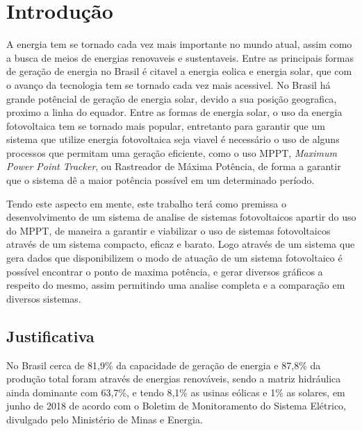 \chapter{Introdução}
\label{cap:01}
A energia tem se tornado cada vez mais importante no mundo atual, assim como a busca de meios de energias renovaveis e sustentaveis. Entre as principais formas de geração de energia no Brasil é citavel a energia eolica e energia solar, que com o avanço da tecnologia tem se tornado cada vez mais acessivel. No Brasil há grande potêncial de geração de energia solar, devido a sua posição geografica, proximo a linha do equador. Entre as formas de energia solar, o uso da energia fotovoltaica tem se tornado mais popular, entretanto para garantir que um sistema que utilize energia fotovoltaica seja viavel é necessário o uso de alguns processos que permitam uma geração eficiente, como o uso MPPT, \textit{Maximum Power Point Tracker}, ou Rastreador de Máxima Potência, de forma a garantir que o sistema dê a maior potência possível em um determinado período.

\indent		Tendo este aspecto em mente, este trabalho terá como premissa o desenvolvimento de um sistema de analise de sistemas fotovoltaicos apartir do uso do MPPT, de maneira a garantir e viabilizar o uso de sistemas fotovoltaicos através de um sistema compacto, eficaz e barato.
Logo através de um sistema que gera dados que disponibilizem o modo de atuação de um sistema fotovoltaico é possível encontrar o ponto de maxima potência, e gerar diversos gráficos a respeito do mesmo, assim permitindo uma analise completa e a comparação em diversos sistemas.


\section{Justificativa}

No Brasil cerca de 81,9\% da capacidade de geração de energia e 87,8\% da produção total foram através de energias renováveis, sendo a matriz hidráulica ainda dominante com 63,7\%, e tendo 8,1\% as usinas eólicas e 1\% as solares, em junho de 2018 de acordo com o Boletim de Monitoramento do Sistema Elétrico, divulgado pelo Ministério de Minas e Energia.

